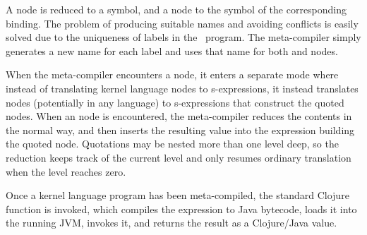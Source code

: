 
A  node is reduced to a symbol, and a  node to the symbol of the corresponding binding. The problem of producing suitable names and avoiding conflicts is easily solved due to the uniqueness of labels in the \Meta\ program. The meta-compiler simply generates a new name for each label and uses that name for both  and  nodes.

When the meta-compiler encounters a  node, it enters a separate mode where instead of translating kernel language nodes to s-expressions, it instead translates nodes (potentially in any language) to s-expressions that construct the quoted nodes. When an  node is encountered, the meta-compiler reduces the contents in the normal way, and then inserts the resulting value into the expression building the quoted node. Quotations may be nested more than one level deep, so the reduction keeps track of the current level and only resumes ordinary translation when the level reaches zero.


Once a kernel language program has been meta-compiled, the standard Clojure function  is invoked, which compiles the expression to Java bytecode, loads it into the running JVM, invokes it, and returns the result as a Clojure/Java value. %




